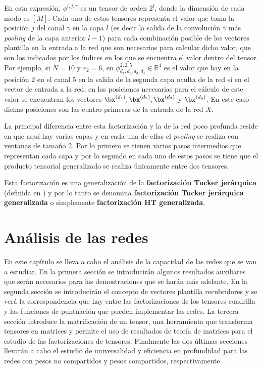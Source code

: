 En esta expresión, $\phi^{l,j,\gamma}$ es un tensor de orden $2^{l}$, donde la dimensión de cada modo es $[M]$. Cada uno de estos tensores representa el valor que toma la posición $j$ del canal $\gamma$ en la capa $l$ (es decir la salida de la convolución $\gamma$ más \textit{pooling} de la capa anterior $l-1$) para cada combinación posible de los vectores plantilla en la entrada a la red que son necesarios para calcular dicho valor, que son los indicados por los índices en los que se encuentra el valor dentro del tensor. Por ejemplo, si $N=10$ y $r_2 = 6$, en $\phi^{2,2,5}_{d_1,d_2,d_3,d_4}\in\mathbb{R}^4$  es el valor que hay en la posición $2$ en el canal $5$ en la salida de la segunda capa oculta de la red si en el vector de entrada a la red, en las posiciones necesarias para el cálculo de este valor se encuentran los vectores $\bx^{(d_1)},\bx^{(d_2)},\bx^{(d_3)}$ y $\bx^{(d_4)}$. En este caso dichas posiciones son las cuatro primeras de la entrada de la red $X$.

La principal diferencia entre esta factorización y la de la red poco profunda reside en que aquí hay varias capas y en cada una de ellas el \textit{pooling} se realiza con ventanas de tamaño 2. Por lo primero se tienen varios pasos intermedios que representan cada capa y por lo segundo en cada uno de estos pasos se tiene que el producto tensorial generalizado se realiza únicamente entre dos tensores.

Esta factorización es una generalización de la \textbf{factorización Tucker jerárquica} (definida en \cite{HacWolfKuhn}) y por lo tanto se denomina \textbf{factorización Tucker jerárquica generalizada} o simplemente \textbf{factorización HT generalizada}.

\newpage
\chapter{Análisis de las redes}
En este capítulo se lleva a cabo el análisis de la capacidad de las redes que se van a estudiar. En la primera sección se introducirán algunos resultados auxiliares que serán necesarios para las demostraciones que se harán más adelante. En la segunda sección se introducirán el concepto de vectores plantilla recubridores y se verá la correspondencia que hay entre las factorizaciones de los tensores cuadrilla y las funciones de puntuación que pueden implementar las redes. La tercera sección introduce la matrificación de un tensor, una herramienta que transforma tensores en matrices y permite el uso de resultados de teoría de matrices para el estudio de las factorizaciones de tensores. Finalmente las dos últimas secciones llevarán a cabo el estudio de universalidad y eficiencia en profundidad para las redes con pesos no compartidos y pesos compartidos, respectivamente.


